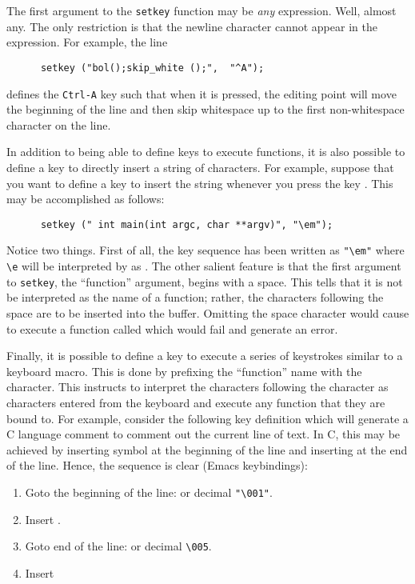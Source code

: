   The first argument to the \verb|setkey| function may be {\em any} \slang
  expression.  Well, almost any.  The only restriction is that the newline
  character cannot appear in the expression.  For example, the line
\begin{verbatim} 
      setkey ("bol();skip_white ();",  "^A");
\end{verbatim}     
  defines the \verb|Ctrl-A| key such that when it is pressed, the editing
  point will move the beginning of the line and then skip whitespace up to
  the first non-whitespace character on the line.
  
  In addition to being able to define keys to execute functions, it is also
  possible to define a key to directly insert a string of characters.  For
  example, suppose that you want to define a key to insert the string
   whenever you press the key 
  .  This may be accomplished as follows:
\begin{verbatim}
      setkey (" int main(int argc, char **argv)", "\em");
\end{verbatim}

  Notice two things.  First of all, the key sequence  has
  been written as \verb|"\em"| where \verb|\e| will be interpreted by \jed{} as
  . The other salient feature is that the first argument to
  \verb|setkey|, the ``function'' argument, begins with a space.  This tells
  \jed{} that it is not be interpreted as the name of a function; rather, the
  characters following the space are to be inserted into the buffer.
  Omitting the space character would cause \jed{} to execute a function called
   which would fail and generate an
  error.

  Finally, it is possible to define a key to execute a series of keystrokes
  similar to a keyboard macro.  This is done by prefixing the ``function''
  name with the  character.  This instructs \jed{} to interpret the
  characters following the  character as characters entered from the
  keyboard and execute any function that they are bound to.  For example,
  consider the following key definition which will generate a C language
  comment to comment out the current line of text.  In C, this may be
  achieved by inserting symbol  at the beginning of the line and
  inserting  at the end of the line.  Hence, the sequence is clear
  (Emacs keybindings):

\begin{itemize} 
\begin{enumerate}
\item Goto the beginning of the line:  or decimal \verb|"\001"|.

\item Insert \var{/*}.

\item Goto end of the line:  or decimal \verb|\005|.

\item Insert \var{*/}
\end{enumerate}
\end{itemize} 

